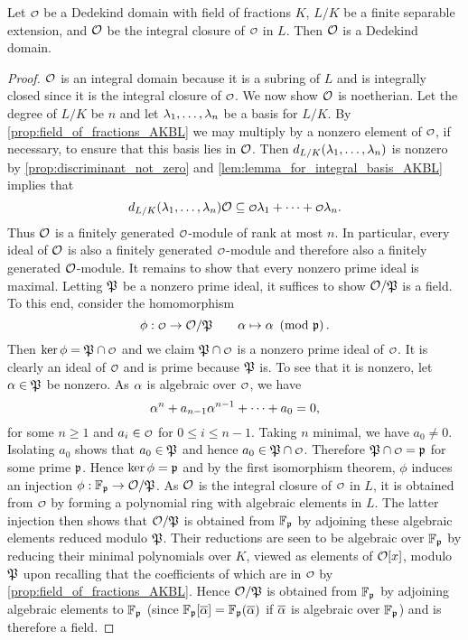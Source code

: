     \begin{proposition}\label{prop:integral_closure_of_Dedekind_is_Dedekind}
      Let $\smc{O}$ be a Dedekind domain with field of fractions $K$, $L/K$ be a finite separable extension, and $\mathcal{O}$ be the integral closure of $\smc{O}$ in $L$. Then $\mathcal{O}$ is a Dedekind domain.
    \end{proposition}
    \begin{proof}
      $\mathcal{O}$ is an integral domain because it is a subring of $L$ and is integrally closed since it is the integral closure of $\smc{O}$. We now show $\mathcal{O}$ is noetherian. Let the degree of $L/K$ be $n$ and let $\lambda_{1},\ldots,\lambda_{n}$ be a basis for $L/K$. By \cref{prop:field_of_fractions_AKBL} we may multiply by a nonzero element of $\smc{O}$, if necessary, to ensure that this basis lies in $\mathcal{O}$. Then $d_{L/K}(\lambda_{1},\ldots,\lambda_{n})$ is nonzero by \cref{prop:discriminant_not_zero} and \cref{lem:lemma_for_integral_basis_AKBL} implies that
      \[
        d_{L/K}(\l_{1},\ldots,\l_{n})\mc{O} \subseteq \smc{O}\l_{1}+\cdots+\smc{O}\l_{n}.
      \]
      Thus $\mathcal{O}$ is a finitely generated $\smc{O}$-module of rank at most $n$. In particular, every ideal of $\mathcal{O}$ is also a finitely generated $\smc{O}$-module and therefore also a finitely generated $\mathcal{O}$-module. It remains to show that every nonzero prime ideal is maximal. Letting $\mathfrak{P}$ be a nonzero prime ideal, it suffices to show $\mathcal{O}/\mathfrak{P}$ is a field. To this end, consider the homomorphism
      \[
        \phi:\smc{O} \to \mc{O}/\mf{P} \qquad \a \mapsto \a \tmod{\mf{p}}.
      \]
      Then $\ker\phi = \mf{P} \cap \smc{O}$ and we claim $\mf{P} \cap \smc{O}$ is a nonzero prime ideal of $\smc{O}$. It is clearly an ideal of $\smc{O}$ and is prime because $\mathfrak{P}$ is. To see that it is nonzero, let $\alpha \in \mathfrak{P}$ be nonzero. As $\alpha$ is algebraic over $\smc{O}$, we have
      \[
        \alpha^{n}+a_{n-1}\alpha^{n-1}+\cdots+a_{0} = 0,
      \]
      for some $n \ge 1$ and $a_{i} \in \smc{O}$ for $0 \le i \le n-1$. Taking $n$ minimal, we have $a_{0} \neq 0$. Isolating $a_{0}$ shows that $a_{0} \in \mathfrak{P}$ and hence $a_{0} \in \mf{P} \cap \smc{O}$. Therefore $\mf{P} \cap \smc{O} = \mf{p}$ for some prime $\mathfrak{p}$. Hence $\ker\phi = \mathfrak{p}$ and by the first isomorphism theorem, $\phi$ induces an injection $\phi:\mathbb{F}_{\mathfrak{p}} \to \mathcal{O}/\mathfrak{P}$. As $\mathcal{O}$ is the integral closure of $\smc{O}$ in $L$, it is obtained from $\smc{O}$ by forming a polynomial ring with algebraic elements in $L$. The latter injection then shows that $\mathcal{O}/\mathfrak{P}$ is obtained from $\mathbb{F}_{\mathfrak{p}}$ by adjoining these algebraic elements reduced modulo $\mathfrak{P}$. Their reductions are seen to be algebraic over $\mathbb{F}_{\mathfrak{p}}$ by reducing their minimal polynomials over $K$, viewed as elements of $\mathcal{O}[x]$, modulo $\mathfrak{P}$ upon recalling that the coefficients of which are in $\smc{O}$ by \cref{prop:field_of_fractions_AKBL}. Hence $\mathcal{O}/\mathfrak{P}$ is obtained from $\mathbb{F}_{\mathfrak{p}}$ by adjoining algebraic elements to $\mathbb{F}_{\mathfrak{p}}$ (since $\mathbb{F}_{\mathfrak{p}}[\overline{\alpha}] = \mathbb{F}_{\mathfrak{p}}(\overline{\alpha})$ if $\overline{\alpha}$ is algebraic over $\mathbb{F}_{\mathfrak{p}}$) and is therefore a field.
    \end{proof}

